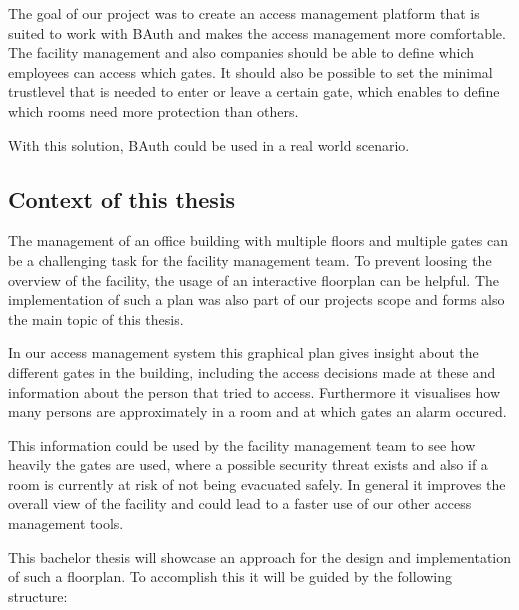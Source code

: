 
The goal of our project was to create an access management platform that is suited to work with BAuth and makes the access management more comfortable. The facility management and also companies should be able to define which employees can access which gates. It should also be possible to set the minimal trustlevel that is needed to enter or leave a certain gate, which enables to define which rooms need more protection than others.

With this solution, BAuth could be used in a real world scenario.

\subsection{Context of this thesis}
\label{Context of this thesis}


The management of an office building with multiple floors and multiple gates can be a challenging task for the facility management team. To prevent loosing the overview of the facility, the usage of an interactive floorplan can be helpful. The implementation of such a plan was also part of our projects scope and forms also the main topic of this thesis.

In our access management system this graphical plan gives insight about the different gates in the building, including the access decisions made at these and information about the person that tried to access. Furthermore it visualises how many persons are approximately in a room and at which gates an alarm occured. 

This information could be used by the facility management team to see how heavily the gates are used, where a possible security threat exists and also if a room is currently at risk of not being evacuated safely. 
In general it improves the overall view of the facility and could lead to a faster use of our other access management tools.

This bachelor thesis will showcase an approach for the design and implementation of such a floorplan. To accomplish this it will be guided by the following structure:

